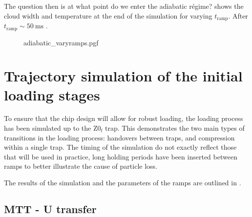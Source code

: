 The question then is at what point do we enter the adiabatic r\'egime?  shows the cloud width and temperature at the end of the simulation for
varying $t_\text{ramp}$. After $t_\text{ramp}\sim\SI{50}{\milli\second}$ .

\begin{figure}[tbhp]
\centering
  {adiabatic_varyramps.pgf}
  \caption{
  }
  \label{design:fig:adiavary}
\end{figure}



\section{Trajectory simulation of the initial loading stages}

To ensure that the chip design will allow for robust loading, the loading
process has been simulated up to the $\mathrm{Z0_f}$ trap. This demonstrates
the two main types of transitions in the loading process: handovers between
traps, and compression within a single trap. The timing of the simulation do
not exactly reflect those that will be used in practice, long holding periods
have been inserted between ramps to better illustrate the cause of particle
loss.

The results of the simulation and the parameters of the ramps are outlined in
.



\subsection{MTT - U transfer}
\label{design:sim:trans_U}

